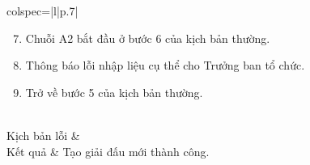 \begin{longtblr}[caption = {Đặc tả usecase Tạo giải đấu},
      label = {tab:usecase2-spec},]{colspec={|l|p{.7\linewidth}|}}
\begin{minipage}{\linewidth}
\begin{enumerate}[label={\textbf{\textcolor{red}{A\arabic*}} --}, align=left, itemsep=-5pt]
\begin{enumerate}[leftmargin=-5px, align=left, label=\arabic*.]
                              \setcounter{enumii}{6}
                              \item[]
                                    \hspace{-25px} Chuỗi A2 bắt đầu ở bước 6 của kịch bản thường.
                              \item Thông báo lỗi nhập liệu cụ thể cho Trưởng ban tổ chức.
                              \item[]
                                    \hspace{-25px} Trở về bước 5 của kịch bản thường.
                        \end{enumerate}
            \end{enumerate}
            \vskip 1pt
      \end{minipage}
      \\\hline
      Kịch bản lỗi         &                                                                                              \\\hline
      Kết quả              & Tạo giải đấu mới thành công.                                                                 \\\hline
\end{longtblr}
